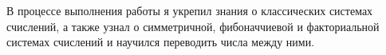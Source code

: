 В процессе выполнения работы я укрепил знания о классических системах счислений, а также узнал о симметричной, фибоначчиевой и факториальной системах счислений и научился переводить числа между ними.